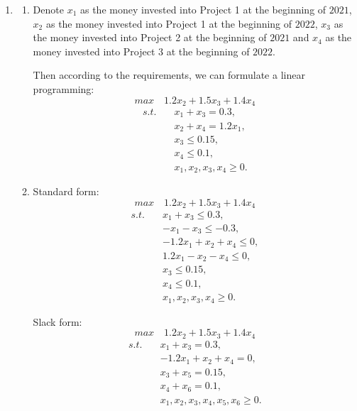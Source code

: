 \documentclass[12pt,a4paper]{article}
\makeatletter
\newtheorem*{solution}{Solution}
\theoremstyle{definition}
\renewenvironment{solution}[1][Solution] {\par\pushQED{\qed}\normalfont\topsep6\p@\@plus6\p@\relax\trivlist\item[\hskip\labelsep\bfseries#1\@addpunct{.}]\ignorespaces}{\popQED\endtrivlist\@endpefalse} \makeatother
\makeatother
\begin{document}
\begin{enumerate}
    
    \begin{solution}    
    \begin{enumerate}
    \item
    Denote $x_1$ as the money invested into Project 1 at the beginning of $2021$, $x_2$ as the money invested into Project 1 at the beginning of $2022$, $x_3$ as the money invested into Project 2 at the beginning of $2021$ and $x_4$ as the money invested into Project 3 at the beginning of $2022$.
    
    Then according to the requirements, we can formulate a linear programming:
    $$max  \quad 1.2x_2+1.5x_3+1.4x_4$$
	\begin{align*}
	s.t. \quad &x_1+x_3 = 0.3,\\
	&x_2+x_4 = 1.2x_1,\\
	&x_3 \leqslant 0.15,\\
	&x_4 \leqslant 0.1,\\
	&x_1,x_2,x_3,x_4 \geqslant 0.
	\end{align*}
    
    \item
    Standard form:
    $$max  \quad 1.2x_2+1.5x_3+1.4x_4$$
	\begin{align*}
	s.t. \quad &x_1+x_3 \leqslant 0.3,\\
	&-x_1-x_3 \leqslant -0.3,\\
	&-1.2x_1+x_2+x_4 \leqslant 0,\\
	&1.2x_1-x_2-x_4 \leqslant 0,\\
	&x_3 \leqslant 0.15,\\
	&x_4 \leqslant 0.1,\\
	&x_1,x_2,x_3,x_4 \geqslant 0.
	\end{align*}
    
    Slack form:
    $$max  \quad 1.2x_2+1.5x_3+1.4x_4$$
	\begin{align*}
	s.t. \quad &x_1+x_3 = 0.3,\\
	&-1.2x_1+x_2+x_4 = 0,\\
	&x_3 + x_5 = 0.15,\\
	&x_4 + x_6 = 0.1,\\
	&x_1,x_2,x_3,x_4,x_5,x_6 \geqslant 0.
	\end{align*}
    

\end{enumerate}
\end{solution}
\end{enumerate}
\end{document}
